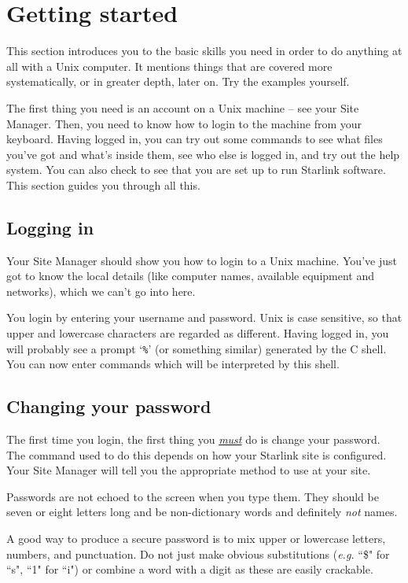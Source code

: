 \newpage

\section{Getting started}

This section introduces you to the basic skills you need in order to do anything
at all with a Unix computer.
It mentions things that are covered more systematically, or in greater depth,
later on.
Try the examples yourself.

The first thing you need is an account on a Unix machine -- see your Site
Manager.
Then, you need to know how to login to the machine from your keyboard.
Having logged in, you can try out some commands to see what files you've got
and what's inside them, see who else is logged in, and try out the help system.
You can also check to see that you are set up to run Starlink software.
This section guides you through all this.

\subsection{Logging in}

Your Site Manager should show you how to login to a Unix machine.
You've just got to know the local details (like computer names, available
equipment and networks), which we can't go into here.

You login by entering your username and password. 
Unix is case sensitive, so that upper and lowercase characters are
regarded as different.
Having logged in, you will probably see a prompt `{\tt \%}' (or something
similar) generated by the
C shell.
You can now enter commands which will 
be interpreted by this shell.

\subsection{Changing your password}

The first time you login, the first thing you \underline{\em must\/} do 
is change your password.
The command used to do this depends on how your Starlink site
is configured.
Your Site Manager will tell you the appropriate method to use at your site.

Passwords are not echoed to the screen when you type them.
They should be seven or eight letters long and
be non-dictionary words and definitely {\em not}\/ names.

A good way to produce a secure password is to mix upper or lowercase
letters, numbers, and punctuation. Do not just make obvious substitutions
({\em e.g.}\/ ``\$" for ``s", ``1" for ``i") or combine a word with a digit
as these are easily crackable.

